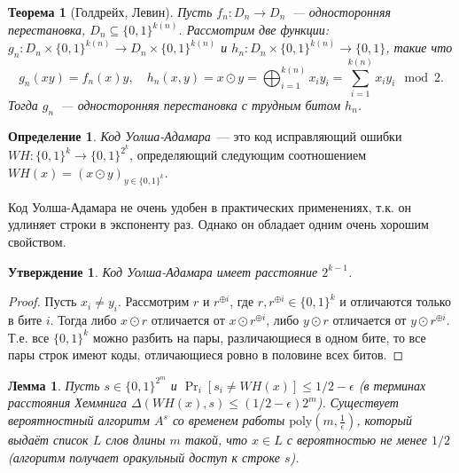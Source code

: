 \documentclass[12pt,a4paper]{article}
\newcommand{\bits}{\{0,1\}}
\newcommand{\poly}{\mathrm{poly}}
\theoremstyle{definition}
\newtheorem{definition}{Определение}[section]
\theoremstyle{plain}
\newtheorem{theorem}{Теорема}[section]
\newtheorem{lemma}{Лемма}[section]
\newtheorem{statement}{Утверждение}[section]
\theoremstyle{remark}
\begin{document}
\begin{theorem}[Голдрейх, Левин]
Пусть $f_n:D_n\to D_n$~--- односторонняя перестановка, $D_n\subseteq \bits^{k(n)}$.
Рассмотрим две функции: $g_n: D_n\times \bits^{k(n)}\to D_n\times \bits^{k(n)}$ и $h_n: D_n\times \bits^{k(n)}\to \bits$, такие что
$$g_n(xy)= f_n(x)y,\quad h_n(x,y) = x\odot y = \bigoplus_{i=1}^{k(n)} x_iy_i = \sum_{i=1}^{k(n)} x_iy_i\mod2.$$ 
Тогда $g_n$~--- односторонняя перестановка
с трудным битом $h_n$.
\end{theorem}

\begin{definition}
\emph{Код Уолша-Адамара}~--- это код исправляющий ошибки $WH: \bits^k\to\bits^{2^k}$,
определяющий следующим соотношением $WH(x)=(x\odot y)_{y\in\bits^{k}}$.
\end{definition}
Код Уолша-Адамара не очень удобен в практических применениях, 
т.к. он удлиняет строки в экспоненту раз.
Однако он обладает одним очень хорошим свойством.
\begin{statement}
Код Уолша-Адамара имеет расстояние $2^{k-1}$.
\end{statement}
\begin{proof}
Пусть $x_i\neq y_i$. Рассмотрим $r$ и $r^{\oplus i}$, где $r,r^{\oplus i}\in\bits^{k}$ и отличаются только в бите $i$.
Тогда либо $x\odot r$ отличается от $x\odot r^{\oplus i}$, либо $y\odot r$ отличается от $y\odot r^{\oplus i}$.
Т.е. все $\bits^k$ можно разбить на пары, различающиеся в одном бите, то все пары строк имеют коды, отличающиеся
ровно в половине всех битов.
\end{proof}

\begin{lemma}\label{lm:WH-list-decoding}
Пусть $s\in\bits^{2^m}$ и $\Pr_i[s_i \neq WH(x)] \le 1/2 - \epsilon$ (в терминах расстояния Хеммнига $\Delta(WH(x), s) \le (1/2 - \epsilon)2^m$). Существует вероятностный алгоритм $A^s$ со временем работы $\poly(m, \frac{1}{\epsilon})$, который выдаёт
список $L$ слов длины $m$ такой, что $x\in L$ с вероятностью не менее $1/2$ (алгоритм получает оракульный доступ к строке $s$).
\end{lemma}
\end{document}

